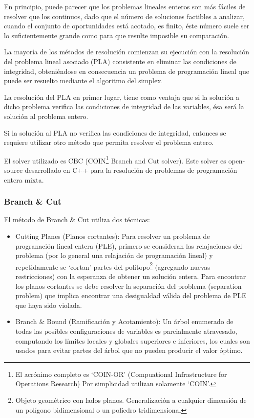 \documentclass[a4paper]{article}
\begin{document}
En principio, puede parecer que los problemas lineales enteros son más fáciles de resolver que los continuos, dado que el número de soluciones factibles a analizar, cuando el conjunto de oportunidades está acotado, es finito, éste número suele ser lo suficientemente grande como para que resulte imposible su comparación.\newline

La mayoría de los métodos de resolución comienzan su ejecución con la resolución del problema lineal asociado (PLA) consistente en eliminar las condiciones de integridad, obteniéndose en consecuencia un problema de programación lineal que puede ser resuelto mediante el algoritmo del simplex.

La resolución del PLA en primer lugar, tiene como ventaja que si la solución a dicho problema verifica las condiciones de integridad de las variables, ésa será la solución al problema entero.

Si la solución al PLA no verifica las condiciones de integridad, entonces se requiere utilizar otro método que permita resolver el problema entero.

El solver utilizado es CBC (COIN\footnote{El acrónimo completo es `COIN-OR' (Compuational Infrastructure for Operations Research) Por simplicidad utilizan solamente `COIN'.} Branch and Cut solver). Este solver es open-source desarrollado en C++ para la resolución de problemas de programación entera mixta.

\subsubsection{Branch \& Cut}

El método de Branch \& Cut utiliza dos técnicas:

\begin{itemize}
	\item Cutting Planes (Planos cortantes): Para resolver un problema de progranación lineal entera (PLE), primero se consideran las relajaciones del problema (por lo general una relajación de programación lineal) y repetidamente se `cortan' partes del politopo\footnote{Objeto geométrico con lados planos. Generalización a cualquier dimensión de un polígono bidimensional o un poliedro tridimensional} (agregando nuevas restricciones) con la esperanza de obtener  un solución entera. Para encontrar los planos cortantes se debe resolver la separación del problema (separation problem) que implica encontrar una desigualdad válida del problema de PLE que haya sido violada.
	
	\item Branch \& Bound (Ramificación y Acotamiento): Un árbol enumerado de todas las posibles configuraciones de variables es parcialmente atravesado, computando los límites locales y globales superiores e inferiores, los cuales son usados para evitar partes del árbol que no pueden producir el valor óptimo.

\end{itemize}
\end{document}
